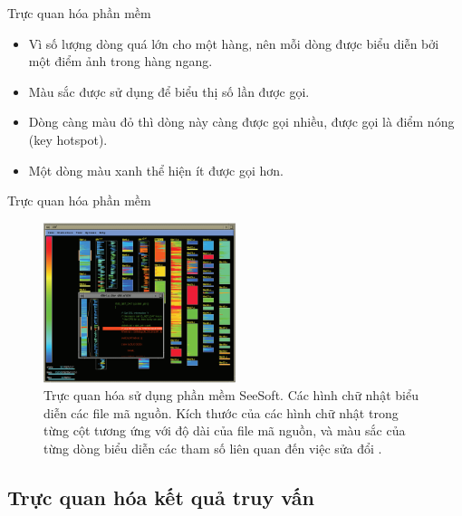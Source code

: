 \documentclass[10pt]{beamer}
\theoremstyle{remark}
\theoremstyle{definition}
\begin{document}
\begin{frame}{Trực quan hóa phần mềm}
	\begin{itemize}
		\item Vì số lượng dòng quá lớn cho một hàng, nên mỗi dòng được biểu diễn bởi một điểm ảnh trong hàng ngang.
		\item Màu sắc được sử dụng để biểu thị số lần được gọi.
		\item Dòng càng màu đỏ thì dòng này càng được gọi nhiều, được gọi là điểm nóng (key hotspot).
		\item Một dòng màu xanh thể hiện ít được gọi hơn.
	\end{itemize}
\end{frame}

\begin{frame}{Trực quan hóa phần mềm}
	\begin{figure}[h!]
        \centering
        \includegraphics[width=0.5\textwidth]{13.png}
        \caption{Trực quan hóa sử dụng phần mềm SeeSoft. Các hình chữ nhật biểu diễn các file mã nguồn.
        Kích thước của các hình chữ nhật trong từng cột tương ứng với độ dài của file mã nguồn, và màu sắc của từng dòng biểu diễn các tham số liên quan đến việc sửa đổi \cite{108}.}
        \label{fig:13}
    \end{figure}
\end{frame}

\subsection{Trực quan hóa kết quả truy vấn}
\end{document}
